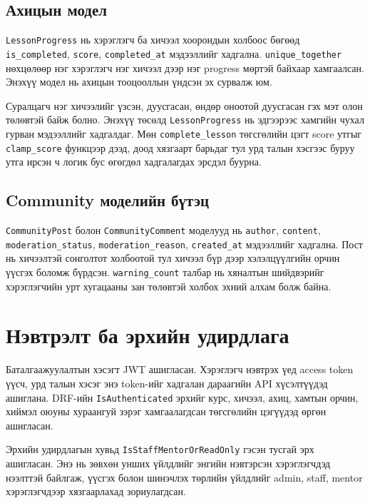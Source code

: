 \subsection{Ахицын модел}
\texttt{LessonProgress} нь хэрэглэгч ба хичээл хоорондын холбоос бөгөөд \texttt{is\_completed}, \texttt{score}, \texttt{completed\_at} мэдээллийг хадгална. \texttt{unique\_together} нөхцөлөөр нэг хэрэглэгч нэг хичээл дээр нэг progress мөртэй байхаар хамгаалсан. Энэхүү модел нь ахицын тооцооллын үндсэн эх сурвалж юм.

Суралцагч нэг хичээлийг үзсэн, дуусгасан, өндөр оноотой дуусгасан гэх мэт олон төлөвтэй байж болно. Энэхүү төсөлд \texttt{LessonProgress} нь эдгээрээс хамгийн чухал гурван мэдээллийг хадгалдаг. Мөн \texttt{complete\_lesson} төгсгөлийн цэгт score утгыг \texttt{clamp\_score} функцээр дээд, доод хязгаарт барьдаг тул урд талын хэсгээс буруу утга ирсэн ч логик бус өгөгдөл хадгалагдах эрсдэл буурна.

\subsection{Community моделийн бүтэц}
\texttt{CommunityPost} болон \texttt{CommunityComment} моделууд нь \texttt{author}, \texttt{content}, \texttt{moderation\_status}, \texttt{moderation\_reason}, \texttt{created\_at} мэдээллийг хадгална. Пост нь хичээлтэй сонголтот холбоотой тул хичээл бүр дээр хэлэлцүүлгийн орчин үүсгэх боломж бүрдсэн. \texttt{warning\_count} талбар нь хяналтын шийдвэрийг хэрэглэгчийн урт хугацааны зан төлөвтэй холбох эхний алхам болж байна.

\section{Нэвтрэлт ба эрхийн удирдлага}
Баталгаажуулалтын хэсэгт JWT ашигласан. Хэрэглэгч нэвтрэх үед access token үүсч, урд талын хэсэг энэ token-ийг хадгалан дараагийн API хүсэлтүүдэд ашиглана. DRF-ийн \texttt{IsAuthenticated} эрхийг курс, хичээл, ахиц, хамтын орчин, хиймэл оюуны хураангуй зэрэг хамгаалагдсан төгсгөлийн цэгүүдэд өргөн ашигласан.

Эрхийн удирдлагын хувьд \texttt{IsStaffMentorOrReadOnly} гэсэн тусгай эрх ашигласан. Энэ нь зөвхөн унших үйлдлийг энгийн нэвтэрсэн хэрэглэгчдэд нээлттэй байлгаж, үүсгэх болон шинэчлэх төрлийн үйлдлийг admin, staff, mentor хэрэглэгчдээр хязгаарлахад зориулагдсан.

